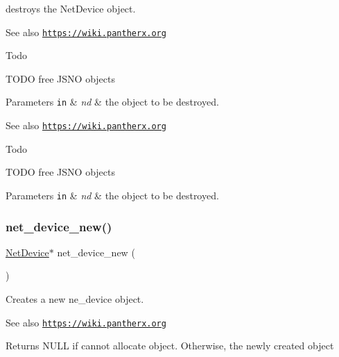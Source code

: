 destroys the Net\+Device object. 

\begin{DoxySeeAlso}{See also}
\href{https://wiki.pantherx.org}{\tt https\+://wiki.\+pantherx.\+org}
\end{DoxySeeAlso}
\begin{DoxyRefDesc}{Todo}
\item[\hyperlink{todo__todo000011}{Todo}]T\+O\+DO free J\+S\+NO objects\end{DoxyRefDesc}



\begin{DoxyParams}[1]{Parameters}
\mbox{\tt in}  & {\em nd} & the object to be destroyed.\\
\hline
\end{DoxyParams}
\begin{DoxySeeAlso}{See also}
\href{https://wiki.pantherx.org}{\tt https\+://wiki.\+pantherx.\+org}
\end{DoxySeeAlso}
\begin{DoxyRefDesc}{Todo}
\item[\hyperlink{todo__todo000003}{Todo}]T\+O\+DO free J\+S\+NO objects\end{DoxyRefDesc}



\begin{DoxyParams}[1]{Parameters}
\mbox{\tt in}  & {\em nd} & the object to be destroyed. \\
\hline
\end{DoxyParams}
\mbox{\label{gnode-object_8h_ae666b3f20895e60917e691c81d464235}} 
\subsubsection{\texorpdfstring{net\+\_\+device\+\_\+new()}{net\_device\_new()}}
{\footnotesize\ttfamily \hyperlink{gnode-object_8h_ab9c23d3a2ba4d9157b5ab053f61388dc}{Net\+Device}$\ast$ net\+\_\+device\+\_\+new (\begin{DoxyParamCaption}{ }\end{DoxyParamCaption})}



Creates a new ne\+\_\+device object. 

\begin{DoxySeeAlso}{See also}
\href{https://wiki.pantherx.org}{\tt https\+://wiki.\+pantherx.\+org}
\end{DoxySeeAlso}
\begin{DoxyReturn}{Returns}
N\+U\+LL if cannot allocate object. Otherwise, the newly created object 
\end{DoxyReturn}
\mbox{\label{gnode-object_8h_a0d906716c0b2c59e34bff01153dc23d2}} 
